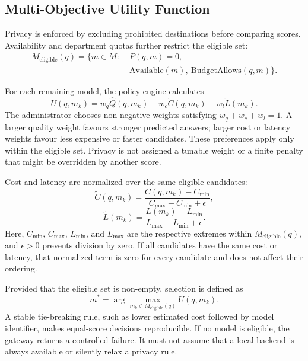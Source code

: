\subsection{Multi-Objective Utility Function}
\label{subsec:utility-func}

Privacy is enforced by excluding prohibited destinations before comparing scores. Availability and department quotas further restrict the eligible set:
\begin{equation}
\begin{split}
M_{\mathrm{eligible}}(q)=\{m\in M:\;&P(q,m)=0,\\
&\mathrm{Available}(m),\ \mathrm{BudgetAllows}(q,m)\}.
\end{split}
\end{equation}

For each remaining model, the policy engine calculates
\begin{equation}
U(q,m_k)=w_q\hat{Q}(q,m_k)
-w_c\widetilde{C}(q,m_k)-w_l\widetilde{L}(m_k).
\label{eq:utility}
\end{equation}
The administrator chooses non-negative weights satisfying $w_q+w_c+w_l=1$. A larger quality weight favours stronger predicted answers; larger cost or latency weights favour less expensive or faster candidates. These preferences apply only within the eligible set. Privacy is not assigned a tunable weight or a finite penalty that might be overridden by another score.

Cost and latency are normalized over the same eligible candidates:
\begin{equation}
\widetilde{C}(q,m_k)=
\frac{C(q,m_k)-C_{\min}}{C_{\max}-C_{\min}+\epsilon},
\end{equation}
\begin{equation}
\widetilde{L}(m_k)=
\frac{L(m_k)-L_{\min}}{L_{\max}-L_{\min}+\epsilon}.
\end{equation}
Here, $C_{\min}$, $C_{\max}$, $L_{\min}$, and $L_{\max}$ are the respective extremes within $M_{\mathrm{eligible}}(q)$, and $\epsilon>0$ prevents division by zero. If all candidates have the same cost or latency, that normalized term is zero for every candidate and does not affect their ordering.

Provided that the eligible set is non-empty, selection is defined as
\begin{equation}
m^*=\arg\max_{m_k\in M_{\mathrm{eligible}}(q)} U(q,m_k).
\end{equation}
A stable tie-breaking rule, such as lower estimated cost followed by model identifier, makes equal-score decisions reproducible. If no model is eligible, the gateway returns a controlled failure. It must not assume that a local backend is always available or silently relax a privacy rule.

